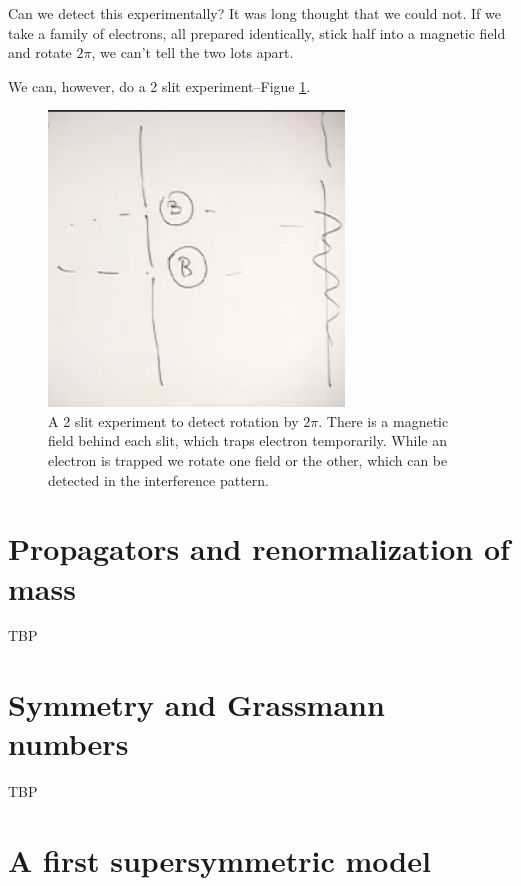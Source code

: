 \documentclass[]{article}
\begin{document}
Can we detect this experimentally? It was long thought that we could not. If we take a family of electrons, all prepared identically, stick half into a magnetic field and rotate $2\pi$, we can't tell the two lots apart.

We can, however, do a 2 slit experiment\cite{aharonov1967observability}--Figue \ref{fig:particles3-2-2slit}.

\begin{figure}[H]
	\begin{center}
		\caption[A 2 slit experiment to detect rotation by $2\pi$]{A 2 slit experiment to detect rotation by $2\pi$. There is a magnetic field behind each slit, which traps electron temporarily. While an electron is trapped we rotate one field or the other, which can be detected in the interference pattern.}\label{fig:particles3-2-2slit}
		\includegraphics[width=0.7\textwidth]{particles3-2-2slit}
	\end{center}
\end{figure}

\section{Propagators and renormalization of mass}

TBP

\section{Symmetry and Grassmann numbers}

TBP

\section{A first supersymmetric model}
\end{document}
